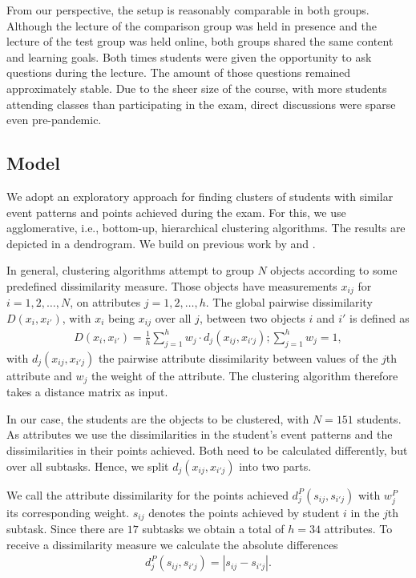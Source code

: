 \documentclass{edm_article}
\begin{document}
From our perspective, the setup is reasonably comparable in both groups. Although the lecture of the comparison group was held in presence and the lecture of the test group was held online, both groups shared the same content and learning goals. Both times students were given the opportunity to ask questions during the lecture. The amount of those questions remained approximately stable. Due to the sheer size of the course, with more students attending classes than participating in the exam, direct discussions were sparse even pre-pandemic.

\subsection{Model}\label{subsec:method}
We adopt an exploratory approach for finding clusters of students with similar event patterns and points achieved during the exam. For this, we use agglomerative, i.e., bottom-up, hierarchical clustering algorithms. The results are depicted in a dendrogram. We build on previous work by \cite{hastie_09} and \cite{ClusterEvents}.

In general, clustering algorithms attempt to group $N$ objects according to some predefined dissimilarity measure. Those objects have measurements $x_{ij}$ for $i = 1, 2, \ldots, N$, on attributes $j = 1, 2, \ldots, h$. The global pairwise dissimilarity $D(x_i, x_{i'})$, with $x_i$ being $x_{ij}$ over all $j$, between two objects $i$ and $i'$ is defined as
\begin{align}
D(x_i, x_{i'}) = \frac{1}{h} \sum^h_{j = 1} w_j \cdot d_j(x_{ij}, x_{i'j}); \sum^h_{j = 1} w_j = 1, \label{eq:eq1} 
\end{align}
with $d_j(x_{ij}, x_{i'j})$ the pairwise attribute dissimilarity between values of the $j$th attribute and $w_j$ the weight of the attribute. The clustering algorithm therefore takes a distance matrix as input.

In our case, the students are the objects to be clustered, with $N = 151$ students. As attributes we use the dissimilarities in the student's event patterns and the dissimilarities in their points achieved. Both need to be calculated differently, but over all subtasks. Hence, we split $d_j(x_{ij}, x_{i'j})$ into two parts. 

We call the attribute dissimilarity for the points achieved $d_j^P(s_{ij}, s_{i'j})$ with $w_j^P$ its corresponding weight. $s_{ij}$ denotes the points achieved by student $i$ in the $j$th subtask. Since there are $17$ subtasks we obtain a total of $h = 34$ attributes. To receive a dissimilarity measure we calculate the absolute differences
\begin{align}
d_j^P(s_{ij}, s_{i'j}) = |s_{ij} - s_{i'j}|. \label{eq:eq3} 
\end{align}
\end{document}
